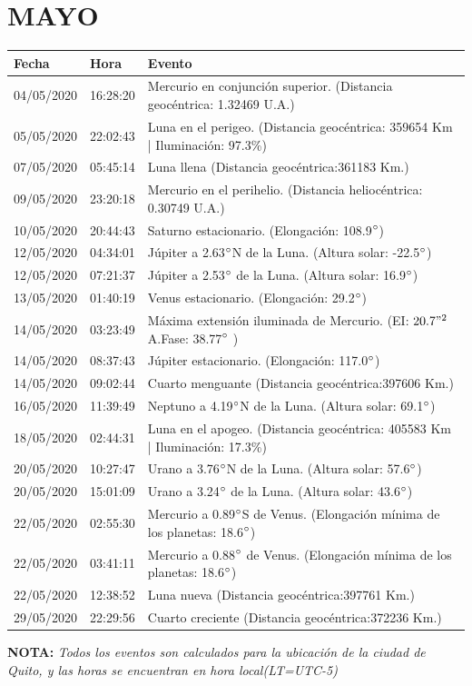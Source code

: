 \documentclass[12pt,a4paper,oneside]{article}
\begin{document}
\section{MAYO}
\begin{center}
\begin{tabular}{ |l| l| l| }
\hline
 \textbf{Fecha} & \textbf{Hora} & \textbf{Evento}\\
 \hline
04/05/2020 &  16:28:20   &  Mercurio en conjunción superior. (Distancia geocéntrica: 1.32469 U.A.)	  \\
05/05/2020 &  22:02:43   &  Luna en el perigeo. (Distancia geocéntrica: 359654 Km | Iluminación: 97.3\%)	  \\
07/05/2020 &  05:45:14   &  Luna llena (Distancia geocéntrica:361183 Km.)	  \\
09/05/2020 &  23:20:18   &  Mercurio en el perihelio. (Distancia heliocéntrica: 0.30749 U.A.)	  \\
10/05/2020 &  20:44:43   &  Saturno estacionario. (Elongación: 108.9$\degree$)	  \\
12/05/2020 &  04:34:01   &  Júpiter a 2.63$\degree$N de la Luna. (Altura solar: -22.5$\degree$)	  \\
12/05/2020 &  07:21:37   &  Júpiter a 2.53$\degree$ de la Luna. (Altura solar: 16.9$\degree$)	  \\
13/05/2020 &  01:40:19   &  Venus estacionario. (Elongación: 29.2$\degree$)	  \\
14/05/2020 &  03:23:49   &  Máxima extensión iluminada de Mercurio. (EI: $20.7"^2$ A.Fase: 38.77$\degree$ ) 	  \\
14/05/2020 &  08:37:43   &  Júpiter estacionario. (Elongación: 117.0$\degree$)	  \\
14/05/2020 &  09:02:44   &  Cuarto menguante (Distancia geocéntrica:397606 Km.)	  \\
16/05/2020 &  11:39:49   &  Neptuno a 4.19$\degree$N de la Luna. (Altura solar: 69.1$\degree$)	  \\
18/05/2020 &  02:44:31   &  Luna en el apogeo. (Distancia geocéntrica: 405583 Km | Iluminación: 17.3\%)	  \\
20/05/2020 &  10:27:47   &  Urano a 3.76$\degree$N de la Luna. (Altura solar: 57.6$\degree$)	  \\
20/05/2020 &  15:01:09   &  Urano a 3.24$\degree$ de la Luna. (Altura solar: 43.6$\degree$)	  \\
22/05/2020 &  02:55:30   &  Mercurio a 0.89$\degree$S de Venus. (Elongación mínima de los planetas: 18.6$\degree$)	  \\
22/05/2020 &  03:41:11   &  Mercurio a 0.88$\degree$ de Venus. (Elongación mínima de los planetas: 18.6$\degree$)	  \\
22/05/2020 &  12:38:52   &  Luna nueva (Distancia geocéntrica:397761 Km.)	  \\   
29/05/2020 &  22:29:56   &  Cuarto creciente (Distancia geocéntrica:372236 Km.)	  \\ 
\hline
\end{tabular}
\end{center}
\vspace{1cm}
\textbf{NOTA:  }\textit{Todos los eventos son calculados para la ubicaci\'on de la ciudad de Quito, y las horas se encuentran en hora local(LT=UTC-5)}
\vspace{0.7cm}
\newpage
\end{document}
